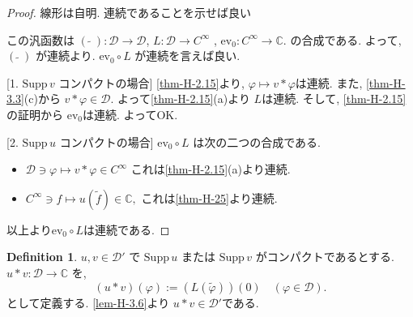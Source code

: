 \documentclass[dvipdfmx,a4paper,11pt]{article} %
\theoremstyle{definition}
\newtheorem{defn}[thm]{Definition}
\theoremstyle{remark}
\numberwithin{equation}{section}
\begin{document}
\begin{proof}
線形は自明. 連続であることを示せば良い

この汎函数は
 \((\,\widetilde{\,}\,): \mathcal{D} \to \mathcal{D}\),
\(L: \mathcal{D} \to C^\infty\) , \(\mathrm{ev}_0 : C^\infty \to \mathbb{C}.\)
の合成である.
よって,  \((\,\widetilde{\,}\,)\) が連続より.
 \(\mathrm{ev}_0 \circ L\) が連続を言えば良い.
 
 [1. \(\mathrm{Supp}\, v\) コンパクトの場合]
\ref{thm-H-2.15}より, \(\varphi \mapsto v \ast \varphi\)は連続. 
また, \ref{thm-H-3.3}(c)から
 $v \ast \varphi  \in \mathcal{D}$. 
よって\ref{thm-H-2.15}(a)より \(L \)は連続. 
そして, \ref{thm-H-2.15}の証明から \(\mathrm{ev}_0 \)は連続. よってOK.

 [2. \(\mathrm{Supp}\, u\) コンパクトの場合]
\(\mathrm{ev}_0 \circ L\) は次の二つの合成である.
\begin{itemize}
\item
\(\mathcal{D} \ni \varphi \mapsto v \ast \varphi \in C^\infty \)
これは\ref{thm-H-2.15}(a)より連続. 
\item\(
C^\infty \ni f \mapsto u(\widetilde{f}) \in \mathbb{C},\) これは\ref{thm-H-25}より連続. 
\end{itemize}
以上より\(\mathrm{ev}_0 \circ L\)は連続である. 
\end{proof}

\begin{tcolorbox}[mybox]
\begin{defn}\cite[Definition 6.36]{Rud}
\label{defn-H-3.7}
\( u, v \in \mathcal{D}' \) で
\(\mathrm{Supp}\, u\) または \(\mathrm{Supp}\, v\) がコンパクトであるとする. 
\( u \ast v : \mathcal{D} \to \mathbb{C} \) を, 
\[
(u \ast v)(\varphi) := (L(\widetilde{\varphi}))(0) \quad (\varphi \in \mathcal{D}).
\]
として定義する. 
\ref{lem-H-3.6}より \( u \ast v \in \mathcal{D}'\)である. 
\end{defn}
\end{tcolorbox}
\end{document}
